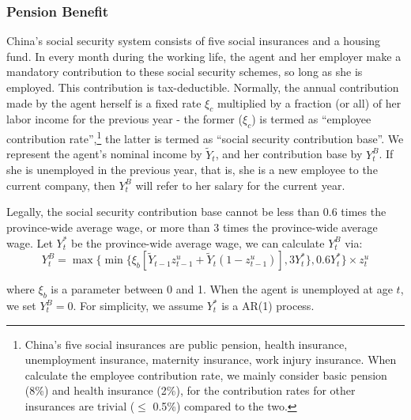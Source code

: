 \documentclass[
  12pt,
]{article}
\begin{document}
\hypertarget{pension-benefit}{%
\subsubsection{\texorpdfstring{Pension Benefit
\label{benefit}}{Pension Benefit }}\label{pension-benefit}}

China's social security system consists of five social insurances and a
housing fund. In every month during the working life, the agent and her
employer make a mandatory contribution to these social security schemes,
so long as she is employed. This contribution is tax-deductible.
Normally, the annual contribution made by the agent herself is a fixed
rate \(\xi_c\) multiplied by a fraction (or all) of her labor income for
the previous year - the former (\(\xi_c\)) is termed as ``employee
contribution rate'',\footnote{China's five social insurances are public
  pension, health insurance, unemployment insurance, maternity
  insurance, work injury insurance. When calculate the employee
  contribution rate, we mainly consider basic pension (8\%) and health
  insurance (2\%), for the contribution rates for other insurances are
  trivial (\(\leq\) 0.5\%) compared to the two.} the latter is termed as
``social security contribution base''. We represent the agent's nominal
income by \(\tilde{Y}_t\), and her contribution base by \(Y^B_t\). If
she is unemployed in the previous year, that is, she is a new employee
to the current company, then \(Y^B_t\) will refer to her salary for the
current year.

Legally, the social security contribution base cannot be less than 0.6
times the province-wide average wage, or more than 3 times the
province-wide average wage. Let \(Y^*_t\) be the province-wide average
wage, we can calculate \(Y^B_t\) via: \begin{equation}
Y^B_t=\max\{\min\{\xi_b[\tilde{Y}_{t-1}z^u_{t-1}+\tilde{Y}_t(1-z^u_{t-1})],3Y^*_t\},0.6Y^*_t\}\times z^u_t
\end{equation}

where \(\xi_b\) is a parameter between 0 and 1. When the agent is
unemployed at age \(t\), we set \(Y^B_t=0\). For simplicity, we assume
\(Y^*_t\) is a AR(1) process.
\end{document}
